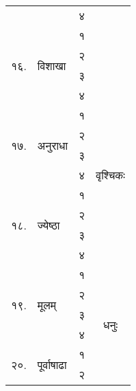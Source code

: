 \begin{longtable}{|l@{~}l|>{\tiny}c|c|}
  &                                        & ४            &                         \\*
  \cline{1-3}\multirow{4}{*}{१६.} & \multirow{4}{*}{विशाखा}                & १            &                         \\*
  &                                        & २            &                         \\*
  &                                        & ३            &                         \\*
  \cline{3-4}                     &                                        & ४            & \multirow{9}{*}{वृश्चिकः} \\*
  \cline{1-3}\multirow{4}{*}{१७.} & \multirow{4}{*}{अनुराधा}                & १            &                         \\*
  &                                        & २            &                         \\*
  &                                        & ३            &                         \\*
  &                                        & ४            &                         \\*
  \cline{1-3}\multirow{4}{*}{१८.} & \multirow{4}{*}{ज्येष्ठा}                 & १            &                         \\*
  &                                        & २            &                         \\*
  &                                        & ३            &                         \\*
  &                                        & ४            &                         \\\hline
  \multirow{4}{*}{१९.}            & \multirow{4}{*}{मूलम्}                   & १            & \multirow{9}{*}{धनुः}    \\*
  &                                        & २            &                         \\*
  &                                        & ३            &                         \\*
  &                                        & ४            &                         \\*
  \cline{1-3}\multirow{4}{*}{२०.} & \multirow{4}{*}{पूर्वाषाढा}              & १            &                         \\*
  &                                        & २            &                         \\*

\end{longtable}
